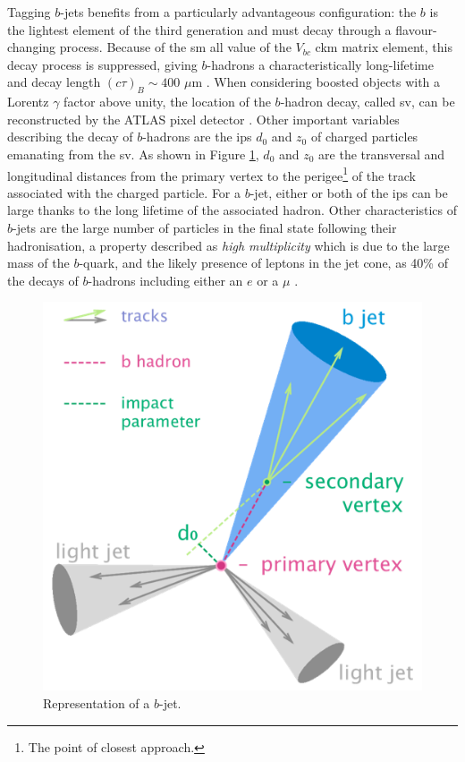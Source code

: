 Tagging $b$-jets benefits from a particularly advantageous configuration: the $b$ is the lightest element of the third generation and must decay through a flavour-changing process. Because of the \gls{sm} all value of the $V_{bc}$ \gls{ckm} matrix element, this decay process is suppressed, giving $b$-hadrons a characteristically long-lifetime and decay length $(c\tau)_{B} \sim 400$  $\mu$m \cite{Tanabashi:2018oca}. When considering boosted objects with a Lorentz $\gamma$ factor above unity, the location of the $b$-hadron decay, called  \gls{sv}, can be reconstructed by the ATLAS pixel detector \cite{Aad:2019aic}. Other important variables describing the decay of $b$-hadrons are the \glspl{ip} $d_0$ and $z_0$ of charged particles emanating from the \gls{sv}. As shown in Figure \ref{fig:bjet}, $d_0$ and $z_0$ are the transversal and longitudinal distances from the primary vertex to the perigee\footnote{The point of closest approach.} of the track associated with the charged particle. For a $b$-jet, either or both of the \glspl{ip} can be large thanks to the long lifetime of the associated hadron. Other characteristics of $b$-jets are the large number of particles in the final state following their hadronisation, a property described as \textit{high multiplicity} which is due to the large mass of the $b$-quark, and the likely presence of leptons in the jet cone, as 40\% of the decays of $b$-hadrons including either an $e$ or a $\mu$ \cite{Tanabashi:2018oca}. \\

\begin{figure}[h!]
\center
\includegraphics[scale=0.6]{Images/bjet}
\caption{Representation of a $b$-jet.} 
\label{fig:bjet}
\end{figure}

